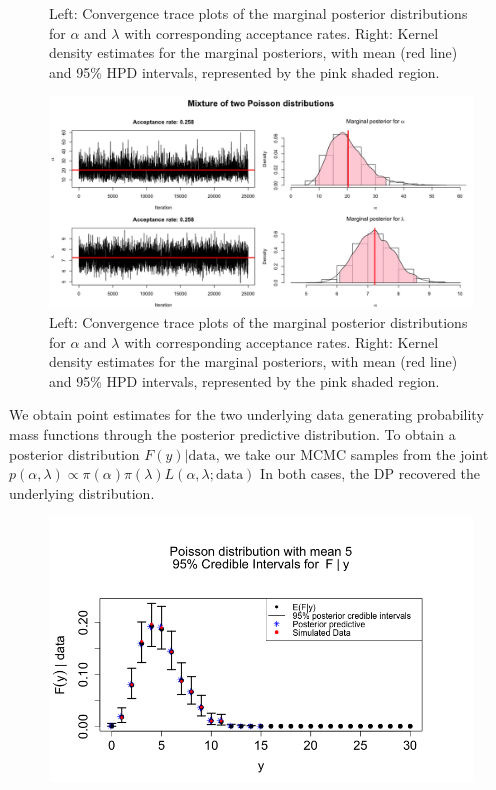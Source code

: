 \documentclass[a4paper, 10pt]{article}
\begin{document}
\begin{enumerate}
\begin{figure}[h!]
        \caption{Left: Convergence trace plots of the marginal posterior distributions for $\alpha$ and $\lambda$ with corresponding acceptance rates. Right: Kernel density estimates for the marginal posteriors, with mean (red line) and 95\% HPD intervals, represented by the pink shaded region.}
        \label{marg_posts_a}
    \end{figure}
    
    \begin{figure}[h!]
        \centering
        \includegraphics[scale = 0.3]{2b_marginals.png}
        \caption{Left: Convergence trace plots of the marginal posterior distributions for $\alpha$ and $\lambda$ with corresponding acceptance rates. Right: Kernel density estimates for the marginal posteriors, with mean (red line) and 95\% HPD intervals, represented by the pink shaded region.}
        \label{marg_posts_b}
    \end{figure}
    \clearpage
    We obtain point estimates for the two underlying data generating probability mass functions through the posterior predictive distribution. To obtain a posterior distribution $F(y)|\text{data}$, we take our MCMC samples from the joint $p(\alpha, \lambda) \propto \pi(\alpha) \pi(\lambda) L(\alpha, \lambda; \text{data})$   In both cases, the DP recovered the underlying distribution.
    \begin{figure}[h!]
        \centering
        \includegraphics[scale = 0.4]{2a_Posterior.png}

\end{figure}
\end{enumerate}
\end{document}
